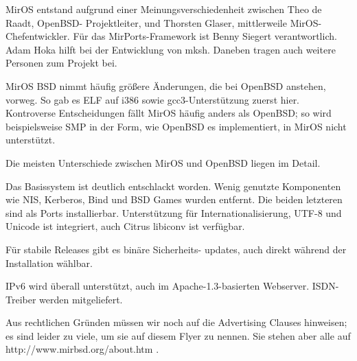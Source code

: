 \documentclass[
a4paper,landscape,11pt,%
notumble%
]{leaflet}
\begin{document}
MirOS entstand aufgrund einer Meinungsverschiedenheit zwischen Theo de Raadt, OpenBSD- Projektleiter, und Thorsten Glaser, mittlerweile MirOS-Chefentwickler. Für das MirPorts-Framework ist Benny Siegert verantwortlich. Adam Hoka hilft bei der Entwicklung von mksh. Daneben tragen auch weitere Personen zum Projekt bei.

MirOS BSD nimmt häufig größere Änderungen, die bei OpenBSD anstehen, vorweg. So gab es ELF auf i386 sowie gcc3-Unterstützung zuerst hier. Kontroverse Entscheidungen fällt MirOS häufig anders als OpenBSD; so wird beispielsweise SMP in der Form, wie OpenBSD es implementiert, in MirOS nicht unterstützt.

Die meisten Unterschiede zwischen MirOS und OpenBSD liegen im Detail.

Das Basissystem ist deutlich entschlackt worden. Wenig genutzte Komponenten wie NIS, Kerberos, Bind und BSD Games wurden entfernt. Die beiden letzteren sind als Ports installierbar. Unterstützung für Internationalisierung, UTF-8 und Unicode ist integriert, auch Citrus libiconv ist verfügbar.

Für stabile Releases gibt es binäre Sicherheits- updates, auch direkt während der Installation wählbar.

IPv6 wird überall unterstützt, auch im Apache-1.3-basierten Webserver. ISDN-Treiber werden mitgeliefert.

Aus rechtlichen Gründen müssen wir noch auf die Advertising Clauses hinweisen; es sind leider zu viele, um sie auf diesem Flyer zu nennen. Sie stehen aber alle
auf http://www.mirbsd.org/about.htm .

\newpage

\end{document}
